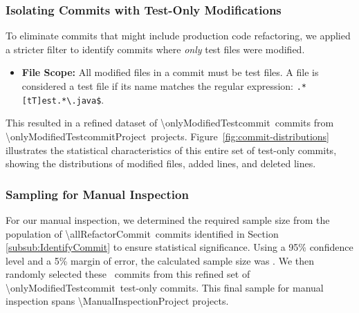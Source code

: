 \subsubsection{Isolating Commits with Test-Only Modifications}
\label{subsub:IsolateTestCommit}
To eliminate commits that might include production code refactoring, we applied a stricter filter to identify commits where \textit{only} test files were modified. 

\begin{itemize}
    \item \textbf{File Scope:} All modified files in a commit must be test files. A file is considered a test file if its name matches the regular expression: \texttt{.*[tT]est.*\textbackslash.java\$}.
\end{itemize}


This resulted in a refined dataset of \num{\onlyModifiedTestcommit}\ commits from \num{\onlyModifiedTestcommitProject}\ projects. 
Figure~\ref{fig:commit-distributions} illustrates the statistical characteristics of this entire set of test-only commits, showing the distributions of modified files, added lines, and deleted lines.


\subsubsection{Sampling for Manual Inspection}


For our manual inspection, we determined the required sample size from the population of \num{\allRefactorCommit}\ commits identified in Section \ref{subsub:IdentifyCommit} to ensure statistical significance. 
Using a 95\% confidence level and a 5\% margin of error, the calculated sample size was \ManualInspectionCommit. 
We then randomly selected these \ManualInspectionCommit\ commits from this refined set of \num{\onlyModifiedTestcommit}\ test-only commits. This final sample for manual inspection spans \num{\ManualInspectionProject} projects.




